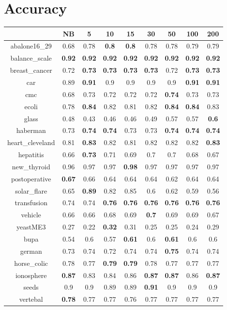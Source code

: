 \documentclass{article}%
\begin{document}
%
\normalsize%
\section*{Accuracy}%
\begin{tabular}{c|cccccccc}%
\hline%
&NB&5&10&15&30&50&100&200\\%
\hline%
abalone16\_29&0.68&0.78&\textbf{0.8}&\textbf{0.8}&0.78&0.78&0.79&0.79\\%
\hline%
balance\_scale&\textbf{0.92}&\textbf{0.92}&\textbf{0.92}&\textbf{0.92}&\textbf{0.92}&\textbf{0.92}&\textbf{0.92}&\textbf{0.92}\\%
\hline%
breast\_cancer&0.72&\textbf{0.73}&\textbf{0.73}&\textbf{0.73}&\textbf{0.73}&0.72&\textbf{0.73}&\textbf{0.73}\\%
\hline%
car&0.89&\textbf{0.91}&0.9&0.9&0.9&0.9&\textbf{0.91}&\textbf{0.91}\\%
\hline%
cmc&0.68&0.73&0.72&0.72&0.72&\textbf{0.74}&0.73&0.73\\%
\hline%
ecoli&0.78&\textbf{0.84}&0.82&0.81&0.82&\textbf{0.84}&\textbf{0.84}&0.83\\%
\hline%
glass&0.48&0.43&0.46&0.46&0.49&0.57&0.57&\textbf{0.6}\\%
\hline%
haberman&0.73&\textbf{0.74}&\textbf{0.74}&0.73&0.73&\textbf{0.74}&\textbf{0.74}&\textbf{0.74}\\%
\hline%
heart\_cleveland&0.81&\textbf{0.83}&0.82&0.81&0.82&0.82&0.82&\textbf{0.83}\\%
\hline%
hepatitis&0.66&\textbf{0.73}&0.71&0.69&0.7&0.7&0.68&0.67\\%
\hline%
new\_thyroid&0.96&0.97&0.97&\textbf{0.98}&0.97&0.97&0.97&0.97\\%
\hline%
postoperative&\textbf{0.67}&0.66&0.64&0.64&0.64&0.62&0.64&0.64\\%
\hline%
solar\_flare&0.65&\textbf{0.89}&0.82&0.85&0.6&0.62&0.59&0.56\\%
\hline%
transfusion&0.74&0.74&\textbf{0.76}&\textbf{0.76}&\textbf{0.76}&\textbf{0.76}&\textbf{0.76}&\textbf{0.76}\\%
\hline%
vehicle&0.66&0.66&0.68&0.69&\textbf{0.7}&0.69&0.69&0.67\\%
\hline%
yeastME3&0.27&0.22&\textbf{0.32}&0.31&0.25&0.25&0.24&0.29\\%
\hline%
bupa&0.54&0.6&0.57&\textbf{0.61}&0.6&\textbf{0.61}&0.6&0.6\\%
\hline%
german&0.73&0.74&0.72&0.74&0.74&\textbf{0.75}&0.74&0.74\\%
\hline%
horse\_colic&0.78&0.77&\textbf{0.79}&\textbf{0.79}&0.78&0.77&0.77&0.77\\%
\hline%
ionosphere&\textbf{0.87}&0.83&0.84&0.86&\textbf{0.87}&\textbf{0.87}&0.86&\textbf{0.87}\\%
\hline%
seeds&0.9&0.9&0.89&0.89&\textbf{0.91}&0.9&0.9&0.9\\%
\hline%
vertebal&\textbf{0.78}&0.77&0.77&0.76&0.77&0.77&0.77&0.77\\%
\hline%
\end{tabular}
\end{document}
